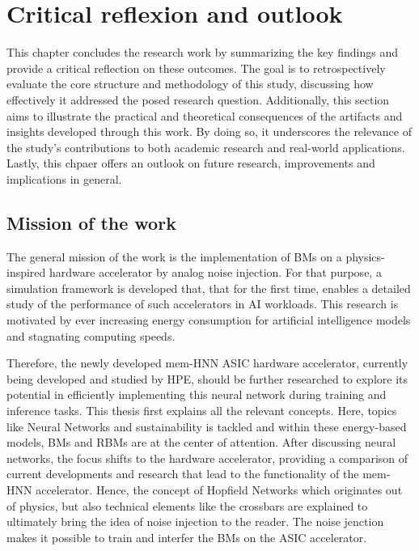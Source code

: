 \chapter{Critical reflexion and outlook}
This chapter concludes the research work by summarizing the key findings and provide a critical reflection on these outcomes.
The goal is to retrospectively evaluate the core structure and methodology of this study, discussing how effectively it addressed the posed research question.
Additionally, this section aims to illustrate the practical and theoretical consequences of the artifacts and insights developed through this work.
By doing so, it underscores the relevance of the study’s contributions to both academic research and real-world applications.
Lastly, this chpaer offers an outlook on future research, improvements and implications in general.

\section{Mission of the work}
The general mission of the work is the implementation of \ac{BM}s on a physics-inspired 
hardware accelerator by analog noise injection. 
For that purpose, a simulation framework is developed that, that for the first time, enables a detailed study of the performance of such accelerators in AI workloads.
This research is motivated by ever increasing energy consumption for artificial intelligence models and stagnating computing speeds.

Therefore, the newly developed \ac{mem-HNN} \ac{ASIC} hardware accelerator, currently being developed and studied by HPE,
should be further researched to explore its potential in efficiently implementing this neural network during training and inference tasks.
This thesis first explains all the relevant concepts.
Here, topics like Neural Networks and sustainability is tackled and within these energy-based models,
\ac{BM}s and \ac{RBM}s are at the center of attention. 
After discussing neural networks, the focus shifts to the hardware accelerator, providing a comparison of current developments and research that lead to the functionality of the \ac{mem-HNN} accelerator.
Hence, the concept of Hopfield Networks which originates out of physics, but also technical elements like the crossbars are explained to 
ultimately bring the idea of noise injection to the reader. 
The noise jenction makes it possible to train and interfer the \ac{BM}s on the \ac{ASIC} accelerator.

